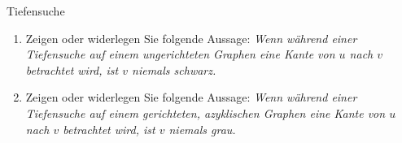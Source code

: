 \documentclass[11pt,a4paper]{article}
\begin{document}
\thispagestyle{empty}
\DeclareRobustCommand{\ttfamily}{\fontencoding{T1}\fontfamily{lmtt}\selectfont}

\newcommand{\quotes}[1]{\glqq{}#1\grqq{}}




\begin{aufgabe}{1}{Tiefensuche}
    \begin{enumerate}
        \item Zeigen oder widerlegen Sie folgende Aussage:
        \emph{Wenn während einer Tiefensuche auf einem ungerichteten Graphen eine Kante von $u$ nach $v$ betrachtet wird, ist $v$ niemals schwarz.}
        \item Zeigen oder widerlegen Sie folgende Aussage:
        \emph{Wenn während einer Tiefensuche auf einem gerichteten, azyklischen Graphen eine Kante von $u$ nach $v$ betrachtet wird, ist $v$ niemals grau.}
    \end{enumerate}
\end{aufgabe}
\end{document}
